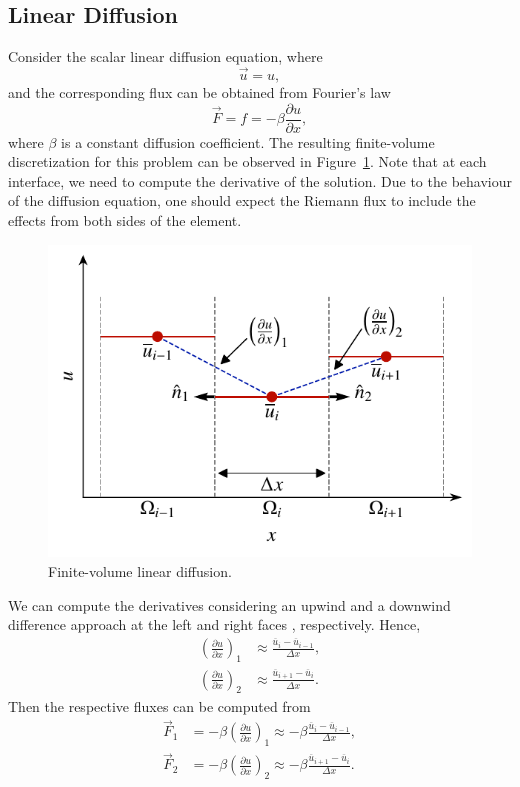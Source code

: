 \subsection{Linear Diffusion}
Consider the scalar linear diffusion equation, where
\begin{equation}
 \vec{u} = u,
\end{equation}
and the corresponding flux can be obtained from Fourier's law
\begin{equation}
 \vec{F} = f = -\beta \frac{\partial u}{\partial x},
\end{equation}
where $\beta$ is a constant diffusion coefficient. The resulting finite-volume discretization for this problem can be observed in Figure~\ref{fig:fv_diffusion}. Note that at each interface, we need to compute the derivative of the solution. Due to the behaviour of the diffusion equation, one should expect the Riemann flux to include the effects from both sides of the element.
\begin{figure}[htbp]
 \centering
 \includegraphics[width=0.5\linewidth]{Pictures/ch11_fv_diffusion}
 \caption{Finite-volume linear diffusion.}
 \label{fig:fv_diffusion}
\end{figure}
We can compute the derivatives considering an upwind and a downwind difference approach at the left and right faces , respectively. Hence,
\begin{align}
 \left(\frac{\partial u}{\partial x}\right)_1 & \approx \frac{\overline u_i - \overline u_{i-1}}{\Delta x}, \\
 \left(\frac{\partial u}{\partial x}\right)_2 & \approx \frac{\overline u_{i+1} - \overline u_{i}}{\Delta x}.
\end{align}
Then the respective fluxes can be computed from
\begin{align}
 \vec F_1 &=-\beta \left(\frac{\partial u}{\partial x}\right)_1 \approx -\beta \frac{\overline u_i - \overline u_{i-1}}{\Delta x},\\
 \vec F_2 &=-\beta \left(\frac{\partial u}{\partial x}\right)_2 \approx -\beta \frac{\overline u_{i+1} - \overline u_{i}}{\Delta x}.
\end{align}

